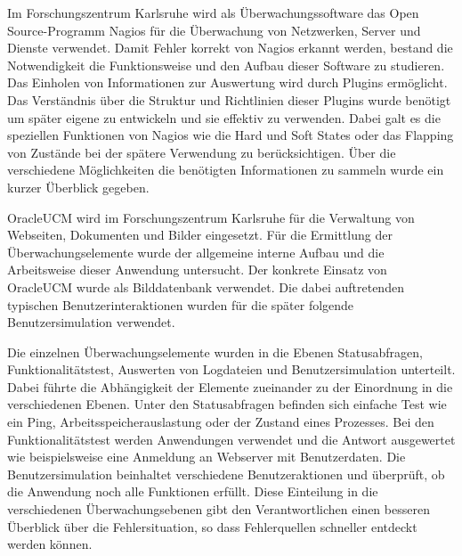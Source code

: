 Im Forschungszentrum Karlsruhe wird als Überwachungssoftware das Open Source-Programm Nagios für die Überwachung von Netzwerken, Server und Dienste verwendet.
Damit Fehler korrekt von Nagios erkannt werden, bestand die Notwendigkeit die Funktionsweise und den Aufbau dieser Software zu studieren.
Das Einholen von Informationen zur Auswertung wird durch Plugins ermöglicht.
Das Verständnis über die Struktur und Richtlinien dieser Plugins wurde benötigt um später eigene zu entwickeln und sie effektiv zu verwenden.
Dabei galt es die speziellen Funktionen von Nagios wie die Hard und Soft States oder das Flapping von Zustände bei der spätere Verwendung zu berücksichtigen.
Über die verschiedene Möglichkeiten die benötigten Informationen zu sammeln wurde ein kurzer Überblick gegeben.

\gls{OracleUCM} wird im Forschungszentrum Karlsruhe für die Verwaltung von Webseiten, Dokumenten und Bilder eingesetzt.
Für die Ermittlung der Überwachungselemente wurde der allgemeine interne Aufbau und die Arbeitsweise dieser Anwendung untersucht.
Der konkrete Einsatz von \gls{OracleUCM} wurde als Bilddatenbank verwendet.
Die dabei auftretenden typischen Benutzerinteraktionen wurden für die später folgende Benutzersimulation verwendet.

Die einzelnen Überwachungselemente wurden in die Ebenen Statusabfragen, Funktionalitätstest, Auswerten von Logdateien und Benutzersimulation unterteilt.
Dabei führte die Abhängigkeit der Elemente zueinander zu der Einordnung in die verschiedenen Ebenen.
Unter den Statusabfragen befinden sich einfache Test wie ein Ping, Arbeitsspeicherauslastung oder der Zustand eines Prozesses.
Bei den Funktionalitätstest werden Anwendungen verwendet und die Antwort ausgewertet wie beispielsweise eine Anmeldung an Webserver mit Benutzerdaten.
Die Benutzersimulation beinhaltet verschiedene Benutzeraktionen und überprüft, ob die Anwendung noch alle Funktionen erfüllt.
Diese Einteilung in die verschiedenen Überwachungsebenen gibt den Verantwortlichen einen besseren Überblick über die Fehlersituation, so dass Fehlerquellen schneller entdeckt werden können.

